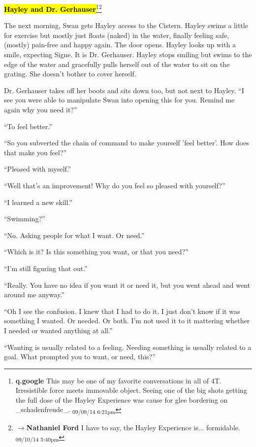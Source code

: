 \textbf{\hl{Hayley and Dr. Gerhauser}}\footnote{\textbf{q.google }This may be one of my favorite conversations in all of 4T.  Irresistible force meets immovable object.  Seeing one of the big shots getting the full dose of the Hayley Experience was cause for glee bordering on \_schadenfreude\_. \textsubscript{09/09/14 6:21pm}}\footnote{$\rightarrow$\textbf{Nathaniel Ford }I have to say, the Hayley Experience is... formidable. \textsubscript{09/10/14 5:40pm}}

The next morning, Swan gets Hayley access to the Cistern.  Hayley swims a little for exercise but mostly just floats (naked) in the water, finally feeling safe, (mostly) pain-free and happy again.  The door opens.  Hayley looks up with a smile, expecting Signe.   It is Dr. Gerhauser.  Hayley stops smiling but swims to the edge of the water and gracefully pulls herself out of the water to sit on the grating.  She doesn't bother to cover herself.



Dr. Gerhauser takes off her boots and sits down too, but not next to Hayley.  ``I see you were able to manipulate Swan into opening this for you.  Remind me again why you need it?''

``To feel better.''

``So you subverted the chain of command to make yourself 'feel better'.  How does that make you feel?''

``Pleased with myself.''

``Well that's an improvement!  Why do you feel so pleased with yourself?''

``I learned a new skill.''

``Swimming?''

``No.  Asking people for what I want.  Or need.''

``Which is it?  Is this something you want, or that you need?''

``I'm still figuring that out.''

``Really.  You have no idea if you want it or need it, but you went ahead and went around me anyway.''

``Oh I see the confusion.  I knew that I had to do it.  I just don't know if it was something I wanted.  Or needed.  Or both.  I'm not used it to it mattering whether I needed or wanted anything at all.''

``Wanting is usually related to a feeling.  Needing something is usually related to a goal.  What prompted you to want, or need, this?''

